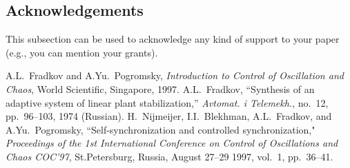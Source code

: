 \subsection*{Acknowledgements}

This subsection can be used to acknowledge any kind
of support to your paper (e.g., you can mention your grants).

\begin{thebibliography}{55}
 A.L.~Fradkov and A.Yu.~Pogromsky,
    {\it Introduction to Control of Oscillation and Chaos},
    World Scientific, Singapore, 1997.
 A.L.~Fradkov, ``Synthesis of an adaptive system
    of linear plant stabilization,'' {\it Avtomat. i Telemekh.},
    no.~12, pp.~96--103, 1974 (Russian).
 H.~Nijmeijer, I.I.~Blekhman, A.L.~Fradkov,
    and A.Yu.~Pogromsky,
    ``Self-synchronization and controlled synchronization,"
    {\it Proceedings of the 1st International Conference on
    Control of Oscillations and Chaos
    COC'97}, St.Petersburg, Russia,
    August 27--29 1997, vol.~1, pp.~36--41.
\end{thebibliography}

